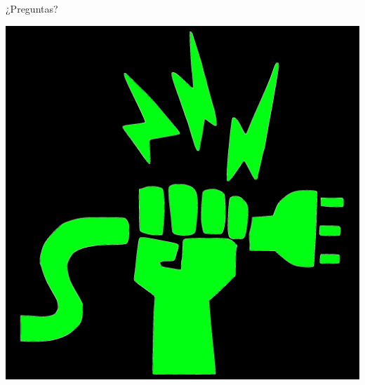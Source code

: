 \documentclass[10pt]{beamer}
\begin{document}
\begin{frame}[standout]
	\centering ¿Preguntas? \\ 
	
	\begin{center}
		\includegraphics[scale=0.1]{./Multimedia/interferencias.jpg}
	\end{center}
\end{frame}
	
\end{document}
